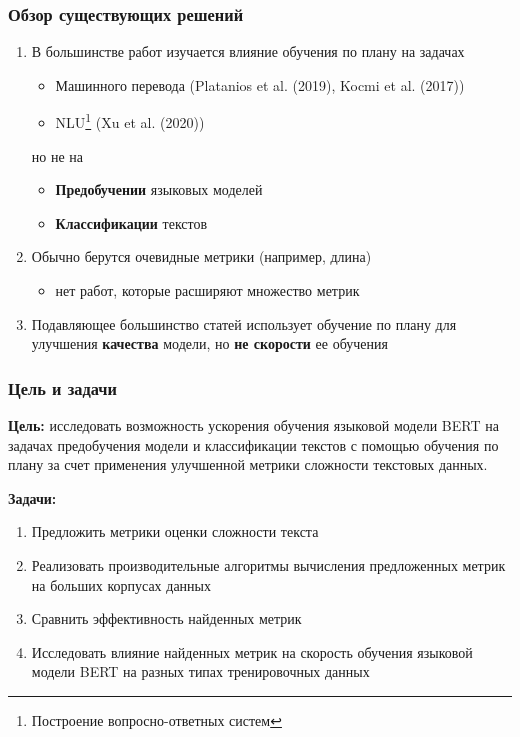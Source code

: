 \documentclass{beamer}
\begin{document}
\begin{frame}
	\frametitle{Обзор существующих решений}

	\begin{enumerate}
		\item 
		В большинстве работ изучается влияние обучения по плану на задачах
		\begin{itemize}
			\item Машинного перевода (Platanios et al. (2019), Kocmi et al. (2017))
			\item NLU\footnote[1]{Построение вопросно-ответных систем} (Xu et al. (2020))
		\end{itemize}
	
		но не на
		\begin{itemize}
			\item {\bf Предобучении} языковых моделей
			\item {\bf Классификации} текстов
		\end{itemize}
	
		\item Обычно берутся очевидные метрики (например, длина)
		\begin{itemize}
			\item нет работ, которые расширяют множество метрик
		\end{itemize}		
	
		\item Подавляющее большинство статей использует обучение по плану для улучшения {\bf качества} модели, но {\bf не скорости} ее обучения
	\end{enumerate}
\end{frame}

\begin{frame}
	\frametitle{Цель и задачи}
	{\bf Цель:} исследовать возможность ускорения обучения языковой модели BERT на задачах предобучения модели и классификации текстов с помощью обучения по плану за счет применения улучшенной метрики сложности текстовых данных.
	
	{\bf Задачи:}
	\begin{enumerate}
		\item Предложить метрики оценки сложности текста
		\item Реализовать производительные алгоритмы вычисления предложенных метрик на больших корпусах данных
		\item Сравнить эффективность найденных метрик
		\item Исследовать влияние найденных метрик на скорость обучения языковой модели BERT на разных типах тренировочных данных
	\end{enumerate}
\end{frame}
\end{document}
